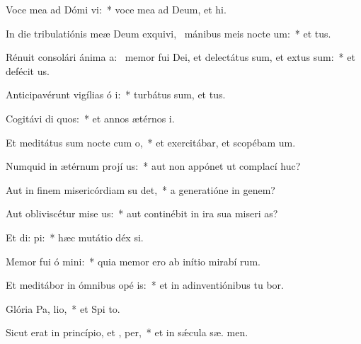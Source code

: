 \item Voce mea ad Dómi vi:~* voce mea ad Deum, et  hi.
\item In die tribulatiónis meæ Deum exquivi,~\pscross{} mánibus meis nocte  um:~* et   tus.
\item Rénuit consolári ánima a:~\pscross{} memor fui Dei, et delectátus sum, et extus sum:~* et defécit  us.
\item Anticipavérunt vigílias ó i:~* turbátus sum, et   tus.
\item Cogitávi di quos:~* et annos ætérnos   i.
\item Et meditátus sum nocte cum  o,~* et exercitábar, et scopébam  um.
\item Numquid in ætérnum projí us:~* aut non appónet ut complací  huc?
\item Aut in finem misericórdiam su det,~* a generatióne in genem?
\item Aut obliviscétur mise us:~* aut continébit in ira sua miseri as?
\item Et di:  pi:~* hæc mutátio déx si.
\item Memor fui ó mini:~* quia memor ero ab inítio mirabí rum.
\item Et meditábor in ómnibus opé is:~* et in adinventiónibus tu bor.
\item Glória Pa,  lio,~* et Spi to.
\item Sicut erat in princípio, et ,  per,~* et in sǽcula sæ. men.
